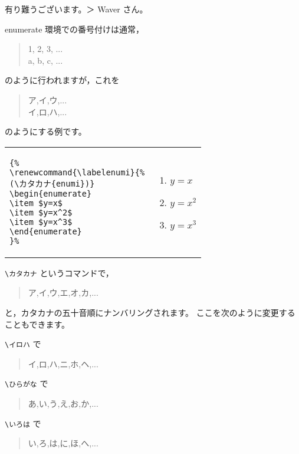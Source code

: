 \documentclass[fleqn,a4j]{jarticle}
\begin{document}
有り難うございます。＞ Waver さん。

enumerate 環境での番号付けは通常，
\begin{quote}
    1, 2, 3, ...\\
    a, b, c, ...
\end{quote}
のように行われますが，これを
\begin{quote}
    ア,イ,ウ,...\\
    イ,ロ,ハ,...
\end{quote}
のようにする例です。

\begin{shadebox}
\begin{tabular}{l@{\ $\longrightarrow$\ }l}
\begin{minipage}{16zw}
\begin{verbatim}
{%
\renewcommand{\labelenumi}{%
(\カタカナ{enumi})}
\begin{enumerate}
\item $y=x$
\item $y=x^2$
\item $y=x^3$
\end{enumerate}
}%
\end{verbatim}
\end{minipage}
&
\begin{minipage}{6zw}
\renewcommand{\labelenumi}{(\カタカナ{enumi})}
\begin{enumerate}
\item $y=x$
\item $y=x^2$
\item $y=x^3$
\end{enumerate}
\end{minipage}
\end{tabular}
\end{shadebox}

\verb/\カタカナ/ というコマンドで，
\begin{quote}
    ア,イ,ウ,エ,オ,カ,...
\end{quote}
と，カタカナの五十音順にナンバリングされます。
ここを次のように変更することもできます。

\verb/\イロハ/ で
\begin{quote}
    イ,ロ,ハ,ニ,ホ,ヘ,...
\end{quote}

\verb/\ひらがな/ で
\begin{quote}
    あ,い,う,え,お,か,...
\end{quote}

\verb/\いろは/ で
\begin{quote}
    い,ろ,は,に,ほ,へ,...
\end{quote}
\end{document}
